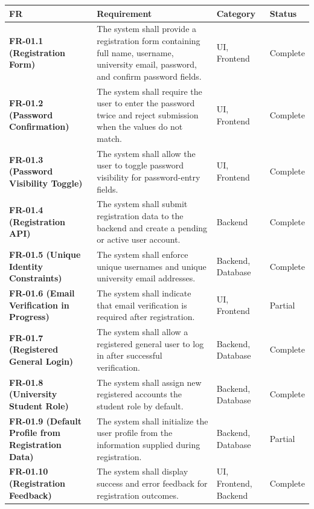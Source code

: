 \documentclass[12pt]{article}
\renewcommand{\baselinestretch}{1.5}
\begin{document}
\begingroup
\small
\renewcommand{\baselinestretch}{1.0}\selectfont
\renewcommand{\arraystretch}{1.15}
\setlength{\tabcolsep}{6pt}
\begin{longtable}{|>{\raggedright\arraybackslash}p{}|>{\raggedright\arraybackslash}p{}|>{\raggedright\arraybackslash}p{}|>{\raggedright\arraybackslash}p{}|}
\hline
\textbf{FR} & \textbf{Requirement} & \textbf{Category} & \textbf{Status} \\ \hline
\endhead
\textbf{FR-01.1 (Registration Form)} & The system shall provide a registration form containing full name, username, university email, password, and confirm password fields. & UI, Frontend & Complete \\ \hline
\textbf{FR-01.2 (Password Confirmation)} & The system shall require the user to enter the password twice and reject submission when the values do not match. & UI, Frontend & Complete \\ \hline
\textbf{FR-01.3 (Password Visibility Toggle)} & The system shall allow the user to toggle password visibility for password-entry fields. & UI, Frontend & Complete \\ \hline
\textbf{FR-01.4 (Registration API)} & The system shall submit registration data to the backend and create a pending or active user account. & Backend & Complete \\ \hline
\textbf{FR-01.5 (Unique Identity Constraints)} & The system shall enforce unique usernames and unique university email addresses. & Backend, Database & Complete \\ \hline
\textbf{FR-01.6 (Email Verification in Progress)} & The system shall indicate that email verification is required after registration. & UI, Frontend & Partial \\ \hline
\textbf{FR-01.7 (Registered General Login)} & The system shall allow a registered general user to log in after successful verification. & Backend, Database & Complete \\ \hline
\textbf{FR-01.8 (University Student Role)} & The system shall assign new registered accounts the student role by default. & Backend, Database & Complete \\ \hline
\textbf{FR-01.9 (Default Profile from Registration Data)} & The system shall initialize the user profile from the information supplied during registration. & Backend, Database & Partial \\ \hline
\textbf{FR-01.10 (Registration Feedback)} & The system shall display success and error feedback for registration outcomes. & UI, Frontend, Backend & Complete \\ \hline

\end{longtable}
\end{document}
